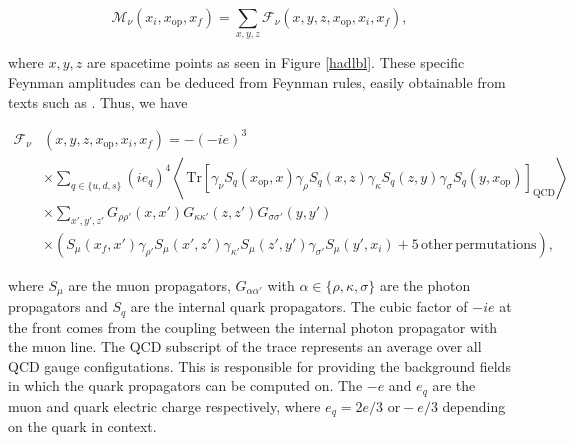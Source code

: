 \documentclass{article}
\numberwithin{equation}{section} %
\begin{document}
\begin{equation}
\mathcal{M}_\nu(x_i,x_\mathrm{op},x_f) = \sum_{x,y,z} \mathcal{F}_\nu(x,y,z,x_\mathrm{op},x_i,x_f),
\label{Feynman amplitude}
\end{equation} 

\noindent where $x,y,z$ are spacetime points as seen in Figure \ref{hadlbl}. These specific Feynman amplitudes can be deduced from Feynman rules, easily obtainable from texts such as \cite{tong}. Thus, we have
%
%

\begin{equation}
\begin{split}
\mathcal{F}_\nu &(x,y,z,x_\mathrm{op}, x_i, x_f) = -(-ie)^3 \\
& \times \sum_{q\in \{u,d,s\}}(ie_q)^4 \left\langle \, \mathrm{Tr}[\gamma_\nu S_q(x_\mathrm{op},x) \gamma_\rho S_q(x,z) \gamma_\kappa S_q(z,y) \gamma_\sigma S_q(y,x_\mathrm{op})]_\mathrm{QCD} \right\rangle \\
&\times \sum_{x',y',z'} G_{\rho\rho '}(x,x')G_{\kappa\kappa '} (z,z') G_{\sigma\sigma '}(y,y')\\
&\times \left( S_\mu(x_f,x') \gamma_{\rho '} S_\mu(x',z') \gamma_{\kappa '} S_\mu(z',y') \gamma_{\sigma '} S_\mu(y',x_i) + \mathrm{5 \, other \, permutations} \right),
\end{split}
\label{Feynman amplitude full}
\end{equation}

\noindent where $S_\mu$ are the muon propagators, $G_{\alpha \alpha '}$ with $\alpha \in \{\rho,\kappa,\sigma \}$ are the photon propagators and $S_q$ are the internal quark propagators. The cubic factor of $-ie$ at the front comes from the coupling between the internal photon propagator with the muon line. The QCD subscript of the trace represents an average over all QCD gauge configutations. This is responsible for providing the background fields in which the quark propagators can be computed on. The $-e$ and $e_q$ are the muon and quark electric charge respectively, where $e_q = 2e/3 \, \, \mathrm{or} -e/3$ depending on the quark in context.  
\end{document}
